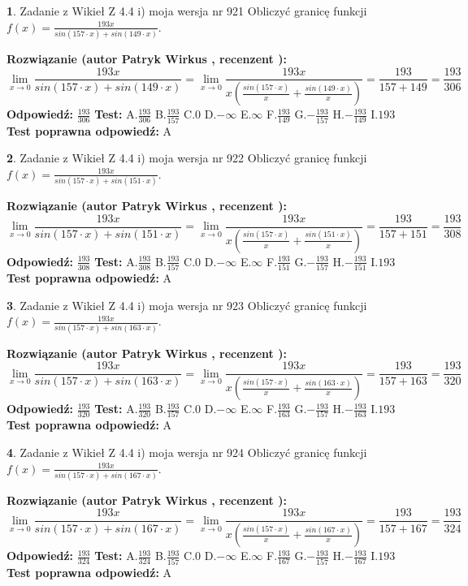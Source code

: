 \documentclass[12pt, a4paper]{article}
\theoremstyle{definition} %
\newtheorem{zad}{}
\newcommand{\zadStart}[1]{\begin{zad}#1\newline}
\newcommand{\zadStop}{\end{zad}}
\newcommand{\rozwStart}[2]{\noindent \textbf{Rozwiązanie (autor #1 , recenzent #2): }\newline}
\newcommand{\rozwStop}{\newline}
\newcommand{\odpStart}{\noindent \textbf{Odpowiedź:}\newline}
\newcommand{\odpStop}{\newline}
\newcommand{\testStart}{\noindent \textbf{Test:}\newline}
\newcommand{\testStop}{\newline}
\newcommand{\kluczStart}{\noindent \textbf{Test poprawna odpowiedź:}\newline}
\newcommand{\kluczStop}{\newline}
\begin{document}
\zadStart{Zadanie z Wikieł Z 4.4 i) moja wersja nr 921}
Obliczyć granicę funkcji $f(x)=\frac{193x}{sin(157\cdot x) +sin(149\cdot x)}$.
\zadStop
\rozwStart{Patryk Wirkus}{}
$$\lim\limits_{x\to 0}\frac{193x}{sin(157\cdot x) +sin(149\cdot x)}=\lim\limits_{x\to 0}\frac{193x}{x(\frac{sin(157\cdot x)}{x}+\frac{sin(149\cdot x)}{x})}=\frac{193}{157+149} = \frac{193}{306}$$
\rozwStop
\odpStart
$\frac{193}{306}$
\odpStop
\testStart
A.$\frac{193}{306}$
B.$\frac{193}{157}$
C.$0$
D.$-\infty$
E.$\infty$
F.$\frac{193}{149}$
G.$-\frac{193}{157}$
H.$-\frac{193}{149}$
I.$193$
\testStop
\kluczStart
A
\kluczStop



\zadStart{Zadanie z Wikieł Z 4.4 i) moja wersja nr 922}
Obliczyć granicę funkcji $f(x)=\frac{193x}{sin(157\cdot x) +sin(151\cdot x)}$.
\zadStop
\rozwStart{Patryk Wirkus}{}
$$\lim\limits_{x\to 0}\frac{193x}{sin(157\cdot x) +sin(151\cdot x)}=\lim\limits_{x\to 0}\frac{193x}{x(\frac{sin(157\cdot x)}{x}+\frac{sin(151\cdot x)}{x})}=\frac{193}{157+151} = \frac{193}{308}$$
\rozwStop
\odpStart
$\frac{193}{308}$
\odpStop
\testStart
A.$\frac{193}{308}$
B.$\frac{193}{157}$
C.$0$
D.$-\infty$
E.$\infty$
F.$\frac{193}{151}$
G.$-\frac{193}{157}$
H.$-\frac{193}{151}$
I.$193$
\testStop
\kluczStart
A
\kluczStop



\zadStart{Zadanie z Wikieł Z 4.4 i) moja wersja nr 923}
Obliczyć granicę funkcji $f(x)=\frac{193x}{sin(157\cdot x) +sin(163\cdot x)}$.
\zadStop
\rozwStart{Patryk Wirkus}{}
$$\lim\limits_{x\to 0}\frac{193x}{sin(157\cdot x) +sin(163\cdot x)}=\lim\limits_{x\to 0}\frac{193x}{x(\frac{sin(157\cdot x)}{x}+\frac{sin(163\cdot x)}{x})}=\frac{193}{157+163} = \frac{193}{320}$$
\rozwStop
\odpStart
$\frac{193}{320}$
\odpStop
\testStart
A.$\frac{193}{320}$
B.$\frac{193}{157}$
C.$0$
D.$-\infty$
E.$\infty$
F.$\frac{193}{163}$
G.$-\frac{193}{157}$
H.$-\frac{193}{163}$
I.$193$
\testStop
\kluczStart
A
\kluczStop



\zadStart{Zadanie z Wikieł Z 4.4 i) moja wersja nr 924}
Obliczyć granicę funkcji $f(x)=\frac{193x}{sin(157\cdot x) +sin(167\cdot x)}$.
\zadStop
\rozwStart{Patryk Wirkus}{}
$$\lim\limits_{x\to 0}\frac{193x}{sin(157\cdot x) +sin(167\cdot x)}=\lim\limits_{x\to 0}\frac{193x}{x(\frac{sin(157\cdot x)}{x}+\frac{sin(167\cdot x)}{x})}=\frac{193}{157+167} = \frac{193}{324}$$
\rozwStop
\odpStart
$\frac{193}{324}$
\odpStop
\testStart
A.$\frac{193}{324}$
B.$\frac{193}{157}$
C.$0$
D.$-\infty$
E.$\infty$
F.$\frac{193}{167}$
G.$-\frac{193}{157}$
H.$-\frac{193}{167}$
I.$193$
\testStop
\kluczStart
A
\kluczStop
\end{document}
